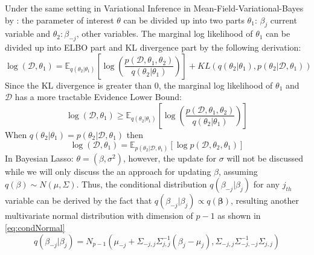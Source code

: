 Under the same setting in Variational Inference in Mean-Field-Variational-Bayes by \cite{Ormerod2010ExplainingVA}:
the parameter of interest $\theta$ can be divided up into two parts $\theta_1$: $\beta_j$ current variable and $\theta_{2}: \beta_{-j}$, other variables. The marginal log likelihood of $\theta_1$ can be divided up into ELBO part and KL divergence part by the following derivation:
\begin{equation}
	\log(\mathcal{D},\theta_1) = \mathbb{E}_{q(\theta_{2}|\theta_1)}[\log(\frac{p(\mathcal{D},\theta_1,\theta_{2})}{q(\theta_{2}|\theta_1)})] + KL(q(\theta_{2}|\theta_1),p(\theta_{2}|\mathcal{D},\theta_1))
\end{equation}
Since the KL divergence is greater than 0, the marginal log likelihood of $\theta_1$ and $\mathcal{D}$ has a more tractable Evidence Lower Bound: 
\begin{equation}
	\log(\mathcal{D},\theta_1) \geq \mathbb{E}_{q(\theta_{2}|\theta_1)}[\log(\frac{p(\mathcal{D},\theta_1,\theta_{2})}{q(\theta_{2}|\theta_1)})]
\end{equation}
When $q(\theta_{2}|\theta_1) = p(\theta_{2}|\mathcal{D},\theta_1)$ then 
$$
	\log(\mathcal{D},\theta_1) = \mathbb{E}_{p(\theta_{2}|\mathcal{D},\theta_1)}[\log p(\mathcal{D},\theta_2,\theta_{1})]
$$
In Bayesian Lasso: $\theta = (\beta,\sigma^2)$, however, the update for $\sigma$ will not be discussed while we will only discuss the an approach for updating $\beta$, assuming $q(\beta) \sim N(\mu,\Sigma)$. Thus,
the conditional distribution $q(\beta_{-j}|\beta_{j})$ for any $j_{th}$ variable can be derived by the fact that $q(\beta_{-j}|\beta_{j}) \propto q(\mathbf{\beta})$, resulting another multivariate normal distribution with dimension of $p-1$ as shown in \autoref{eq:condNormal}
\begin{equation}
	\label{eq:condNormal}
	q(\beta_{-j}|\beta_{j}) = N_{p-1}(\mu_{-j}+\Sigma_{-j,j}\Sigma_{j,j}^{-1}(\beta_j-\mu_j), \Sigma_{-j,j} \Sigma_{-j,-j}^{-1}\Sigma_{j,j})
\end{equation}





